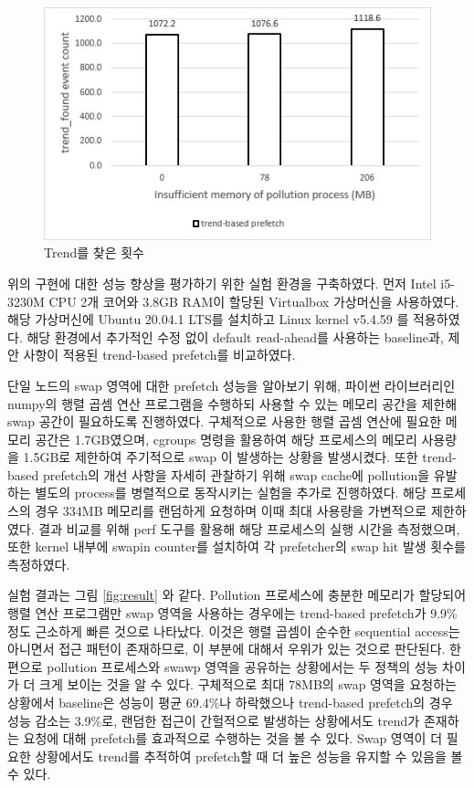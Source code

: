 \documentclass[conference,11pt]{IEEEtran}
\begin{document}
\begin{CJK}{UTF8}{}
    \begin{figure}[t]
        \centerline{\includegraphics[width=\linewidth]{trend_found.png}}
        \caption{Trend를 찾은 횟수}
        \label{fig:trend_found}
    \end{figure}

    위의 구현에 대한 성능 향상을 평가하기 위한 실험 환경을 구축하였다. 먼저 Intel i5-3230M CPU 2개 코어와 3.8GB RAM이 할당된 Virtualbox 가상머신을 사용하였다. 해당 가상머신에 Ubuntu 20.04.1 LTS를 설치하고 Linux kernel v5.4.59 를 적용하였다. 해당 환경에서 추가적인 수정 없이 default read-ahead를 사용하는 baseline과, 제안 사항이 적용된 trend-based prefetch를 비교하였다.

    단일 노드의 swap 영역에 대한 prefetch 성능을 알아보기 위해, 파이썬 라이브러리인 numpy의 행렬 곱셈 연산 프로그램을 수행하되 사용할 수 있는 메모리 공간을 제한해 swap 공간이 필요하도록 진행하였다. 구체적으로 사용한 행렬 곱셈 연산에 필요한 메모리 공간은 1.7GB였으며, cgroups 명령을 활용하여 해당 프로세스의 메모리 사용량을 1.5GB로 제한하여 주기적으로 swap 이 발생하는 상황을 발생시켰다. 또한 trend-based prefetch의 개선 사항을 자세히 관찰하기 위해 swap cache에 pollution을 유발하는 별도의 process를 병렬적으로 동작시키는 실험을 추가로 진행하였다. 해당 프로세스의 경우 334MB 메모리를 랜덤하게 요청하며 이때 최대 사용량을 가변적으로 제한하였다. 결과 비교를 위해 perf 도구를 활용해 해당 프로세스의 실행 시간을 측정했으며, 또한 kernel 내부에 swapin counter를 설치하여 각 prefetcher의 swap hit 발생 횟수를 측정하였다.

    실험 결과는 그림 \ref{fig:result} 와 같다. Pollution 프로세스에 충분한 메모리가 할당되어 행렬 연산 프로그램만 swap 영역을 사용하는 경우에는 trend-based prefetch가 9.9\% 정도 근소하게 빠른 것으로 나타났다. 이것은 행렬 곱셈이 순수한 sequential access는 아니면서 접근 패턴이 존재하므로, 이 부분에 대해서 우위가 있는 것으로 판단된다. 한편으로 pollution 프로세스와 swawp 영역을 공유하는 상황에서는 두 정책의 성능 차이가 더 크게 보이는 것을 알 수 있다. 구체적으로 최대 78MB의 swap 영역을 요청하는 상황에서 baseline은 성능이 평균 69.4\%나 하락했으나 trend-based prefetch의 경우 성능 감소는 3.9\%로, 랜덤한 접근이 간헐적으로 발생하는 상황에서도 trend가 존재하는 요청에 대해 prefetch를 효과적으로 수행하는 것을 볼 수 있다. Swap 영역이 더 필요한 상황에서도 trend를 추적하여 prefetch할 때 더 높은 성능을 유지할 수 있음을 볼 수 있다.


\end{CJK}
\end{document}
